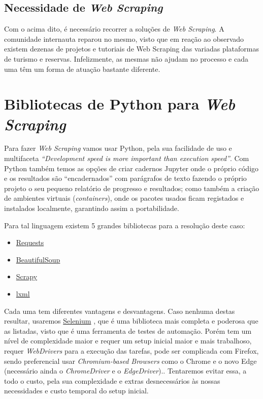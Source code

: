 \documentclass[a4paper,10pt]{article}
\begin{document}
\subsection{Necessidade de \textit{Web Scraping}}

Com o acima dito, é necessário recorrer a soluções de \textit{Web Scraping}.
A comunidade internauta reparou no mesmo, visto que em reação ao observado existem dezenas de projetos e tutoriais de Web Scraping das variadas plataformas de turismo e reservas.
Infelizmente, as mesmas não ajudam no processo e cada uma têm um forma de atuação bastante diferente.

\section{Bibliotecas de Python para \textit{Web Scraping}}

Para fazer \textit{Web Scraping} vamos usar Python, pela sua facilidade de uso e multifaceta \textit{``Development speed is more important than execution speed''}.
Com Python também temos as opções de criar cadernos Jupyter onde o próprio código e os resultados são ``encadernados'' com parágrafos de texto fazendo o próprio projeto o seu pequeno relatório de progresso e resultados; como também a criação de ambientes virtuais (\textit{containers}), onde os pacotes usados ficam registados e instalados localmente, garantindo assim a portabilidade.

Para tal linguagem existem 5 grandes bibliotecas para a resolução deste caso:
\begin{itemize}
    \item \href{https://pypi.org/project/requests/}{Requests}
    \item \href{https://pypi.org/project/BeautifulSoup/}{BeautifulSoup}
    \item \href{https://pypi.org/project/Scrapy3/}{Scrapy}
    \item \href{https://pypi.org/project/lxml/}{lxml}
\end{itemize}

Cada uma tem diferentes vantagens e desvantagens.
Caso nenhuma destas resultar, usaremos \href{https://pypi.org/project/selenium/}{Selenium} , que é uma biblioteca mais completa e poderosa que as listadas, visto que é uma ferramenta de testes de automação.
Porém tem um nível de complexidade maior e requer um setup inicial maior e mais trabalhoso, requer \textit{WebDrivers} para a execução das tarefas, pode ser complicada com Firefox, sendo preferencial usar \textit{Chromium-based Browsers} como o Chrome e o novo Edge (necessário ainda o \textit{ChromeDriver} e o \textit{EdgeDriver})..
Tentaremos evitar essa, a todo o custo, pela sua complexidade e extras desnecessários às nossas necessidades e custo temporal do setup inicial.
\end{document}
